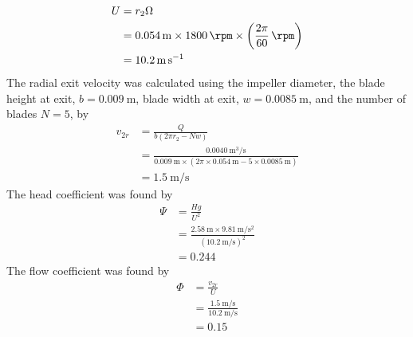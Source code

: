 \begin{align*}
    U &= r_2 \Omega \\
    &= \qty{0.054}{\meter} \times \qty{1800}{\rpm} \times \left(\frac{2\pi}{60}\,\unit{\per\rpm}\right) \\
    &= \qty{10.2}{\meter\per\second}
\end{align*}
The radial exit velocity was calculated using the impeller diameter, the blade height at exit, $b = \qty{0.009}{\meter}$, blade width at exit, $w = \qty{0.0085}{\meter}$, and the number of blades $N=5$, by
\begin{align*}
    v_{2r} &= \frac{Q}{b(2\pi r_2 - Nw)} \\
    &= \frac{\qty{0.0040}{\meter\cubed\per\second}}{\qty{0.009}{\meter} \times (2\pi \times \qty{0.054}{\meter} - 5 \times \qty{0.0085}{\meter})} \\
    &= \qty{1.5}{\meter\per\second}
\end{align*}
The head coefficient was found by
\begin{align*}
    \Psi &= \frac{Hg}{U^2} \\
    &= \frac{\qty{2.58}{\meter} \times \qty{9.81}{\meter\per\second\squared}}{(\qty{10.2}{\meter\per\second})^2} \\
    &= 0.244
\end{align*}
The flow coefficient was found by
\begin{align*}
    \Phi &= \frac{v_{2r}}{U} \\
    &= \frac{\qty{1.5}{\meter\per\second}}{\qty{10.2}{\meter\per\second}} \\
    &= 0.15
\end{align*}
